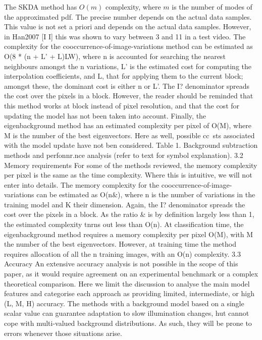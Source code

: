 The SKDA method has $O(m)$ complexity, where $m$ is the number of modes of
the approximated pdf. 
The precise number depends on the actual data samples.
This value
is
not
set
a
priori
and
depends on the actual data samples. However,
in Han2007
[I
I]
this
was shown
to
vary between
3
and
11
in
a
test
video.
The
complexity
for
the
cooccurrence-of-image-variations
method can be
estimated
as
O(8
*
(n
+
L'
+
L)LW),
where
n
is
accounted
for
searching the nearest neighbours
amongst
the
n
variations,
L'
is
the estimated cost
for
computing the interpolation
coefficients,
and
L,
that for
applying
them to
the current block; amongst
these,
the
dominant cost
is either
n
or
L'.
The
I?
denominator
spreads the cost
over
the pixels
in
a block. However,
the
reader should
be
reminded
that this
method works
at
block instead
of
pixel
resolution,
and
that
the
cost
for
updating the
model
has
not
been taken
into
account.
Finally,
the eigenbackground method
has an
estimated
complexity per pixel
of
O(M),
where
M
is
the
number
of
the best eigenvectors. Here
as
well, possible
cc~sts
associated with the model update have not
ben
considered.
Table
1.
Background subtraction methods and perfonnr.nce
analysis
(refer
to
text
for
symbol explanation).
3.2
Memory
requirements
For
some
of
the methods reviewed,
the
memory
complexity
per
pixel
is
the
same
as
the time complexity.
Where
this is intuitive,
we
will
not enter
into details.
The
memory
complexity
for
the cooccurrence-of-image-
variations can
be
estimated
as
O(n&),
where
n
is
the
number
of
variations
in
the
training
model and
K
their
dimension.
Again, the
I?
denominator spreads
the
cost
over
the pixels
in
a block. As the
ratio
&
is
by
definition
largely
less
than
1,
the estimated complexity
tnrns
out
less
than
O(n).
At
classification
time,
the
eigenbackground method requires a
memory
complexity
per pixel
O(M),
with
M
the number
of
the best
eigenvectors. However,
at
training
time the method
requires allocation of
all
the
n
training
images, with
an
O(n)
complexity.
3.3
Accuracy
An
extensive accuracy analysis
is
not
possible
in
the
scope of
this
paper,
as
it
would require agreement on
an
experimental benchmark
or
a complex
theoretical
comparison.
Here we
limit
the discussion
to
analyse the
main
model features
and
categorise
each
approach
as
providing
limited,
intermediate,
or
high
(L,
M,
H)
accuracy.
The methods with a background model based
on
a
single scalar
value can guarantee adaptation
to
slow
illumination changes,
hut
cannot cope
with
multi-valued
background
distributions.
As such, they will
be
prone
to
errors
whenever those
situations arise.
